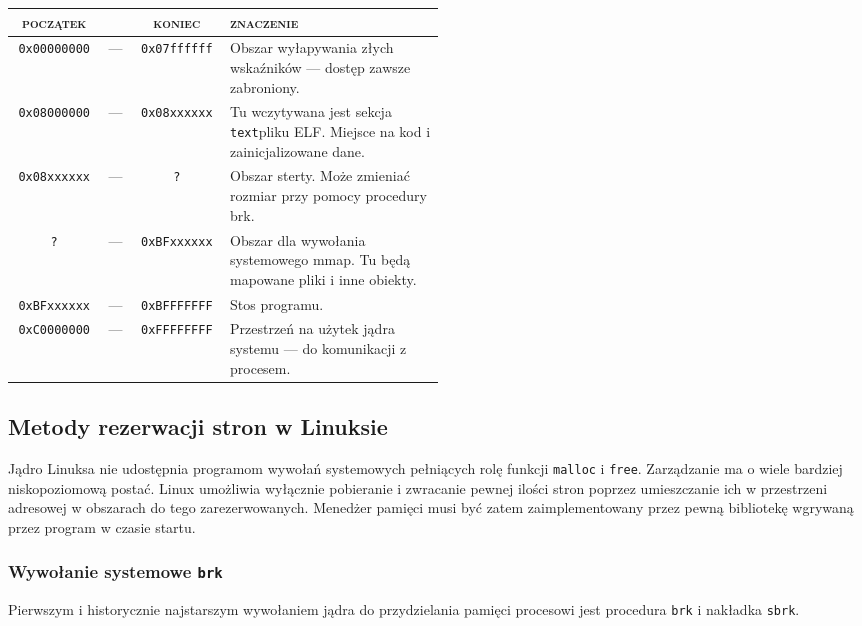 \documentclass[12pt,a4paper,titlepage,twoside]{mwart}
\begin{document}
\begin{center}
\begin{tabular}{|ccc|p{0.5\linewidth}|}
\hline
\textsc{początek} & & \textsc{koniec} & \textsc{znaczenie} \\
\hline
\hline
\texttt{0x00000000} & --- & \texttt{0x07ffffff} & Obszar wyłapywania złych wskaźników --- dostęp zawsze zabroniony.\\
\hline
\texttt{0x08000000} & --- & \texttt{0x08xxxxxx} & Tu wczytywana jest sekcja \texttt{text}\footnotemark pliku ELF. Miejsce na kod i zainicjalizowane dane.\\
\hline
\texttt{0x08xxxxxx} & --- & \texttt{?}          & Obszar sterty. Może zmieniać rozmiar przy pomocy procedury brk.\\
\hline
\texttt{?}          & --- & \texttt{0xBFxxxxxx} & Obszar dla wywołania systemowego mmap. Tu będą mapowane pliki i inne obiekty.\\
\hline
\texttt{0xBFxxxxxx} & --- & \texttt{0xBFFFFFFF} & Stos programu.\\
\hline
\texttt{0xC0000000} & --- & \texttt{0xFFFFFFFF} & Przestrzeń na użytek jądra systemu --- do komunikacji z procesem.\\
\hline
\end{tabular}
\end{center}

\subsection{Metody rezerwacji stron w Linuksie}

Jądro Linuksa nie udostępnia programom wywołań systemowych pełniących rolę
funkcji \texttt{malloc} i \texttt{free}. Zarządzanie ma o wiele bardziej
niskopoziomową postać. Linux umożliwia wyłącznie pobieranie i zwracanie pewnej
ilości stron poprzez umieszczanie ich w przestrzeni adresowej w obszarach do
tego zarezerwowanych. Menedżer pamięci musi być zatem zaimplementowany przez
pewną bibliotekę wgrywaną przez program w czasie startu.

\subsubsection{Wywołanie systemowe \texttt{brk}}

Pierwszym i historycznie najstarszym wywołaniem jądra do przydzielania pamięci
procesowi jest procedura \texttt{brk} i nakładka \texttt{sbrk}.
\end{document}
